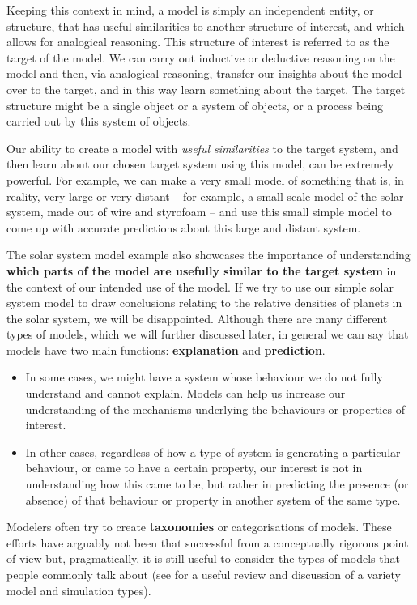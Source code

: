 \newl Keeping this context in mind, a model is simply an independent entity, or structure, that has useful similarities to another structure of interest, and which allows for analogical reasoning. This structure of interest is referred to as the target of the model. We can carry out inductive or deductive reasoning on the model and then, via analogical reasoning, transfer our insights about the model over to the target, and in this way learn something about the target. The target structure might be a single object or a system of objects, or a process being carried out by this system of objects.

Our ability to create a model with \textit{useful similarities} to the target system, and then learn about our chosen target system using this model, can be extremely powerful. For example, we can make a very small model of something that is, in reality, very large or very distant -- for example, a small scale model of the solar system, made out of wire and styrofoam -- and use this small simple model to come up with accurate predictions about this large and distant system. \par The solar system model example also showcases the importance of understanding \textbf{which parts of the model are usefully similar to the target system} in the context of our intended use of the model. If we try to use our simple solar system model to draw conclusions relating to the relative densities of planets in the solar system, we will be disappointed.
\newl Although there are many different types of models, which we will further discussed later, in general we can say that models have two main functions: \textbf{explanation} and \textbf{prediction}. 
\begin{itemize}[noitemsep]
\item In some cases, we might have a system whose behaviour we do not fully understand and cannot explain. Models can help us  increase our understanding of the mechanisms underlying the behaviours or properties of interest. 
\item In other cases, regardless of how a type of system is generating a particular behaviour, or came to have a certain property, our interest is not in understanding how this came to be, but rather in predicting the presence (or absence) of that behaviour or property in another system of the same type.
\end{itemize}
Modelers often try to create \textbf{taxonomies} or categorisations of models. These efforts have arguably not been that successful from a conceptually rigorous point of view but, pragmatically, it is still useful to consider the types of models that people commonly talk about (see \cite{SIM_Y} for a useful review and discussion of a variety model and simulation types).
